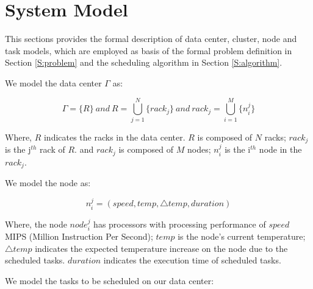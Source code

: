 


\section{System Model}
This sections provides the formal description of data center, cluster, node and task models, which are employed as basis of the formal problem definition in Section \ref{S:problem} and the scheduling algorithm in Section \ref{S:algorithm}.

We model the data center $\Gamma$ as: 

\begin{equation}
\Gamma=\{R\} ~and~ R=\bigcup_{j=1}^{N} \{rack_j\} ~and~ rack_j=\bigcup_{i=1}^{M}\{n_i^j\}
\end{equation}

Where, $R$ indicates the racks in the data center. 
$R$ is composed of $N$ racks; $rack_j$ is the j$^{th}$ rack of $R$. 
and $rack_j$ is composed of $M$ nodes; $n_i^j$ is the i$^{th}$ node in the $rack_j$.

We model the node as:

\begin{equation}
n_i^j=(speed, temp,\bigtriangleup{temp},duration)
\end{equation}

Where, the node $node_i^j$ has processors with processing performance of $speed$ MIPS (Million Instruction Per Second); $temp$ is the node's current temperature; $\bigtriangleup{temp}$  indicates the expected temperature increase on the node due to the scheduled tasks. $duration$ indicates the execution time of scheduled tasks.

We model the tasks to be scheduled on our data center:

